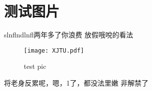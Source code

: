 \chapter{测试图片}
    slnflndlnfl两年多了你浪费
    放假哦哾的看法

    \begin{figure}[h!]
        \texttt{[image: XJTU.pdf]}
        \caption{\small test pic}
    \end{figure}

    将老身反累呢，嗯，1了，都没法里嫩
    非解禁了
\label{chap:chapter label}
